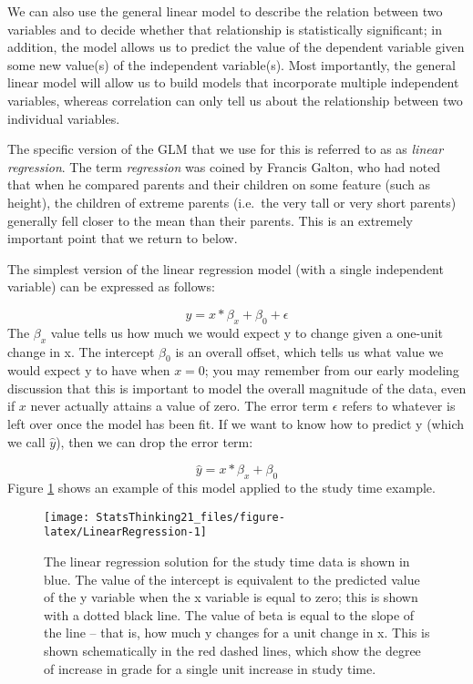 \documentclass[]{book}
\theoremstyle{definition}
\theoremstyle{definition}
\theoremstyle{definition}
\theoremstyle{remark}
\begin{document}
We can also use the general linear model to describe the relation
between two variables and to decide whether that relationship is
statistically significant; in addition, the model allows us to predict
the value of the dependent variable given some new value(s) of the
independent variable(s). Most importantly, the general linear model will
allow us to build models that incorporate multiple independent
variables, whereas correlation can only tell us about the relationship
between two individual variables.

The specific version of the GLM that we use for this is referred to as
as \emph{linear regression}. The term \emph{regression} was coined by
Francis Galton, who had noted that when he compared parents and their
children on some feature (such as height), the children of extreme
parents (i.e.~the very tall or very short parents) generally fell closer
to the mean than their parents. This is an extremely important point
that we return to below.

The simplest version of the linear regression model (with a single
independent variable) can be expressed as follows:

\[
y = x * \beta_x + \beta_0 + \epsilon
\] The \(\beta_x\) value tells us how much we would expect y to change
given a one-unit change in x. The intercept \(\beta_0\) is an overall
offset, which tells us what value we would expect y to have when
\(x=0\); you may remember from our early modeling discussion that this
is important to model the overall magnitude of the data, even if \(x\)
never actually attains a value of zero. The error term \(\epsilon\)
refers to whatever is left over once the model has been fit. If we want
to know how to predict y (which we call \(\hat{y}\)), then we can drop
the error term:

\[
\hat{y} = x * \beta_x + \beta_0 
\] Figure \ref{fig:LinearRegression} shows an example of this model
applied to the study time example.

\begin{figure}
\texttt{[image: StatsThinking21\_files/figure-latex/LinearRegression-1]} \caption{The linear regression solution for the study time data is shown in blue. The value of the intercept is equivalent to the predicted value of the y variable when the x variable is equal to zero; this is shown with a dotted black line.  The value of beta is equal to the slope of the line -- that is, how much y changes for a unit change in x.  This is shown schematically in the red dashed lines, which show the degree of increase in grade for a single unit increase in study time.}\label{fig:LinearRegression}
\end{figure}
\end{document}
